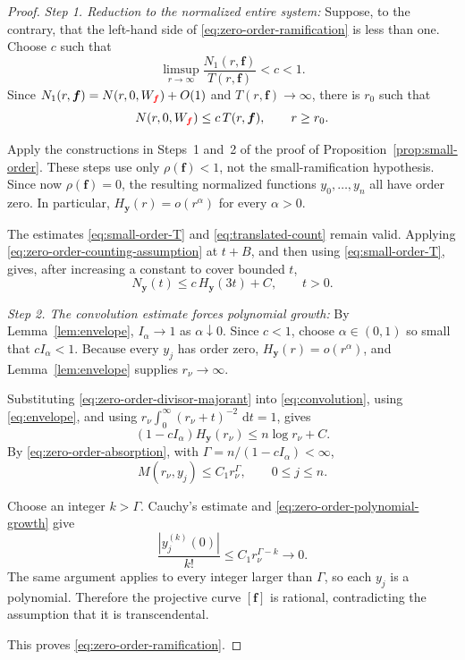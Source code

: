 \documentclass[12pt,letterpaper,reqno]{amsart}
\theoremstyle{definition}
\numberwithin{equation}{section}
\newcommand{\dd}{\,\mathrm d}
\newcommand{\fv}{\bm f}
\newcommand{\yv}{\bm y}
\newcommand{\revision}[1]{\textcolor{red}{#1}}
\begin{document}
\begin{proof}

\medskip\noindent
\emph{{Step 1. Reduction to the normalized entire system:}}
Suppose, to the contrary, that the left-hand side of
\eqref{eq:zero-order-ramification} is less than one. Choose \(c\) such
that
\[
 \limsup_{r\to\infty}
 \frac{N_1(r,\fv)}{T(r,\fv)}
 <c<1.
\]
Since \(N_1(r,\fv)=N(r,0,W_{\revision{\fv}})+O(1)\) and
\(T(r,\fv)\to\infty\), there is \(r_0\) such that
\begin{equation}\label{eq:zero-order-counting-assumption}
 N(r,0,W_{\revision{\fv}})
 \leq
 c\,T(r,\fv),
 \qquad
 r\geq r_0.
\end{equation}

Apply the constructions in Steps~1 and~2 of the proof of
Proposition~\ref{prop:small-order}. These steps use only
\(\rho(\fv)<1\), not the small-ramification hypothesis. Since now
\(\rho(\fv)=0\), the resulting normalized functions
\(y_0,\ldots,y_{n}\) all have order zero. In particular,
\(H_{\yv}(r)=o(r^\alpha)\) for every \(\alpha>0\).

The estimates \eqref{eq:small-order-T} and
\eqref{eq:translated-count} remain valid. Applying
\eqref{eq:zero-order-counting-assumption} at \(t+B\), and then using
\eqref{eq:small-order-T}, gives, after increasing a constant to cover
bounded \(t\),
\begin{equation}\label{eq:zero-order-divisor-majorant}
 N_{\yv}(t)
 \leq
 c\,H_{\yv}(3t)+C,
 \qquad
 t>0.
\end{equation}


\medskip\noindent
\emph{{Step 2. The convolution estimate forces polynomial growth:}}
By Lemma~\ref{lem:envelope},
\(I_\alpha\to1\) as \(\alpha\downarrow0\). Since \(c<1\), choose
\(\alpha\in(0,1)\) so small that
\(cI_\alpha<1\). Because every \(y_j\) has order zero,
\(H_{\yv}(r)=o(r^\alpha)\), and Lemma~\ref{lem:envelope} supplies
\(r_\nu\to\infty\).

Substituting \eqref{eq:zero-order-divisor-majorant} into
\eqref{eq:convolution}, using \eqref{eq:envelope}, and using
\(r_\nu\int_0^\infty(r_\nu+t)^{-2}\,\dd t=1\), gives
\begin{equation}\label{eq:zero-order-absorption}
 (1-cI_\alpha)H_{\yv}(r_\nu)
 \leq
 n\log r_\nu+C.
\end{equation}
By \eqref{eq:zero-order-absorption}, with
\(\Gamma=n/(1-cI_\alpha)<\infty\),
\begin{equation}\label{eq:zero-order-polynomial-growth}
 M(r_\nu,y_j)
 \leq
 C_1r_\nu^\Gamma,
 \qquad
 0\leq j\leq n.
\end{equation}

Choose an integer \(k>\Gamma\). Cauchy's estimate and
\eqref{eq:zero-order-polynomial-growth} give
\[
 \frac{|y_j^{(k)}(0)|}{k!}
 \leq
 C_1r_\nu^{\Gamma-k}
 \longrightarrow0.
\]
The same argument applies to every integer larger than \(\Gamma\), so
each \(y_j\) is a polynomial. Therefore the projective curve
\([\fv]\) is rational, contradicting the assumption that it is
transcendental.

This proves \eqref{eq:zero-order-ramification}.
\end{proof}
\end{document}
